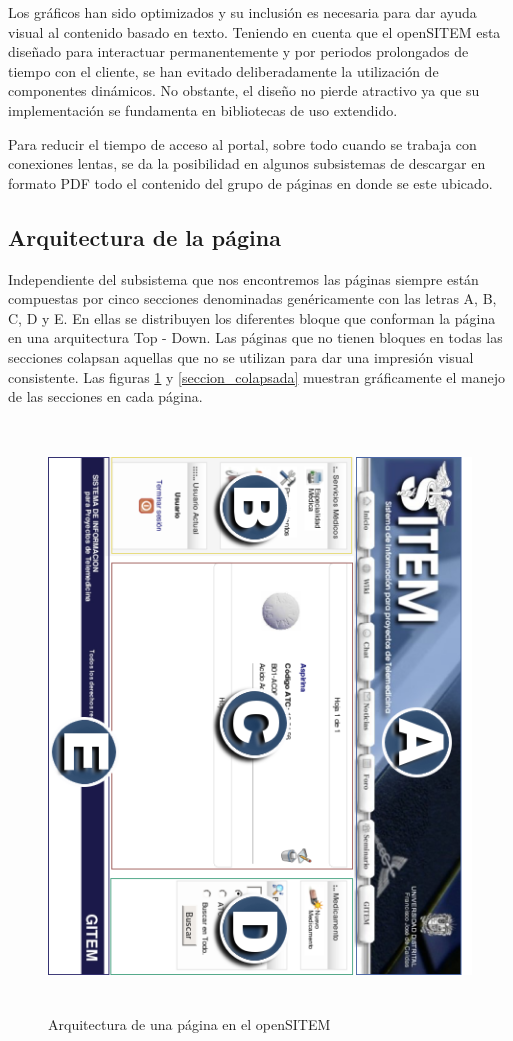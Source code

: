 Los gráficos han sido optimizados y su inclusión es necesaria para dar ayuda visual al contenido basado en texto. Teniendo en cuenta que el openSITEM esta diseñado para interactuar permanentemente y por periodos prolongados de tiempo con el cliente, se han evitado deliberadamente la utilización  de componentes dinámicos. No obstante, el diseño no pierde atractivo ya que su implementación se fundamenta en bibliotecas de uso extendido.

Para reducir el tiempo de acceso al portal, sobre todo cuando se trabaja con conexiones lentas, se da la posibilidad en algunos subsistemas de descargar en formato PDF todo el contenido del grupo de páginas en donde se este ubicado.

\subsection{Arquitectura de la página}

Independiente del subsistema que nos encontremos las páginas siempre están compuestas por cinco secciones denominadas genéricamente con las letras A, B, C, D y E. En ellas se distribuyen los diferentes bloque que conforman la página en una arquitectura Top - Down. Las páginas que no tienen bloques en todas las secciones colapsan aquellas que no se utilizan para dar una impresión visual consistente. Las figuras \ref{secciones} y \ref{seccion_colapsada} muestran gráficamente el manejo de las secciones en cada página.

\begin{figure}
 \centering
 \includegraphics[width=156mm, height=156mm]{secciones.png}
 \caption{Arquitectura de una página en el openSITEM}
 \label{secciones}
\end{figure}

